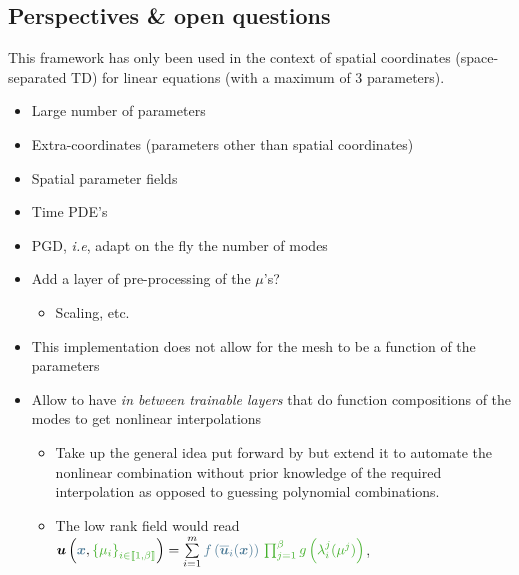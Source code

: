 \subsection{Perspectives \& open questions}

This framework has only been used in the context of spatial coordinates (space-separated TD) for linear equations (with a maximum of 3 parameters). 

\begin{itemize}
    \item Large number of parameters
    \item Extra-coordinates (parameters other than spatial coordinates)
    \item Spatial parameter fields
    \item Time PDE's 
    \item PGD, \emph{i.e}, adapt on the fly the number of modes
    \item Add a layer of pre-processing of the $\mu$'s?
    \begin{itemize}
        \item Scaling, etc.
    \end{itemize}
    \item[\textcolor{RougeLMS}{\faLock}] This implementation does not allow for the mesh to be a function of the parameters
    \item[\textcolor{LGreenLMS}{\faCheckCircle }] Allow to have \emph{in between trainable layers} that do function compositions of the modes to get nonlinear interpolations
        \begin{itemize}
        \item Take up the general idea put forward by \cite{kramer_learning_2024,geelen_learning_2023} but extend it to automate the nonlinear combination  without prior knowledge of the required interpolation as opposed to guessing polynomial combinations.
        \item The low rank field would read $\vect{u}\left(\textcolor{BleuLMS!70}{\vect{x}}, \textcolor{LGreenLMS}{\left\{\mu_i\right\}_{i \in \llbracket 1, \beta \rrbracket}}\right) = \sum\limits_{i=1}^m \textcolor{BleuLMS!70}{f\left(\overline{\vect{u}}_i(\vect{x})\right)} ~\textcolor{LGreenLMS}{\prod_{j=1}^{\beta}g\left(\lambda_i^j(\mu^j)\right)}$, 

\end{itemize}
\end{itemize}
